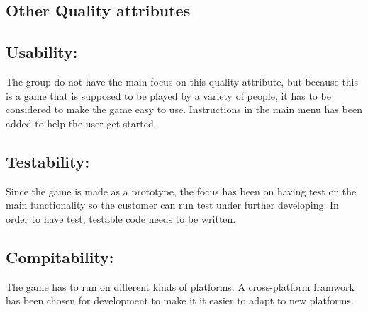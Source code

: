 \subsection{Other Quality attributes}
\subsection*{Usability: } The group do not have the main focus on this quality attribute, but because this is a game that is supposed to be played by a variety of people, it has to be considered to make the game easy to use. Instructions in the main menu has been added to help the user get started.

\subsection*{Testability: } Since the game is made as a prototype, the focus has been on having
test on the main functionality so the customer can run test under further developing.
In order to have test, testable code needs to be written.

\subsection*{Compitability: } The game has to run on different kinds of platforms. A cross-platform framwork has been chosen for development to make it it easier to adapt to new platforms.
